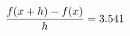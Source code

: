\documentclass[preview]{standalone}
\begin{document}
\begin{align*}
\special{dvisvgm:raw <g id='unique000'>}\frac{f(x+h)-f(x)}{h} = 3.541\special{dvisvgm:raw </g>}
\end{align*}
\end{document}
